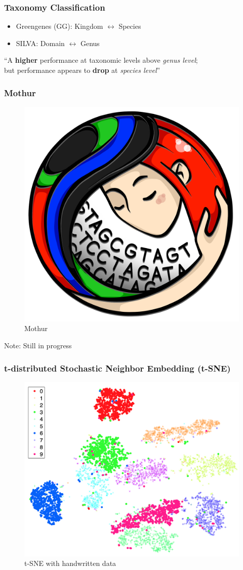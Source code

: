 \documentclass{beamer}
\begin{document}
    \begin{frame}
        \frametitle{Taxonomy Classification}

        \begin{itemize}
            \item Greengenes (GG): Kingdom $\leftrightarrow$ Species \cite{greengenes1}
            \item SILVA: Domain $\leftrightarrow$ Genus \cite{silva1, silva2}
        \end{itemize}

        “A \textbf{higher} performance at taxonomic levels above \textit{genus level}; \\
        but performance appears to \textbf{drop} at \textit{species level}” \cite{performance1}
    \end{frame}

    \begin{frame}
        \frametitle{Mothur}

        \begin{figure}[h!]
            \includegraphics[width=0.3 \linewidth]{figures/mothur.png}
            \caption{Mothur}
        \end{figure}

        Note: Still in progress
    \end{frame}

    \begin{frame}
        \frametitle[t-SNE]{t-distributed Stochastic Neighbor Embedding (t-SNE)}

        \begin{figure}[h!]
            \includegraphics[width=0.6 \linewidth]{figures/tsne.png}
            \caption{t-SNE with handwritten data \protect \cite{tsne1}}
        \end{figure}
    \end{frame}
\end{document}
